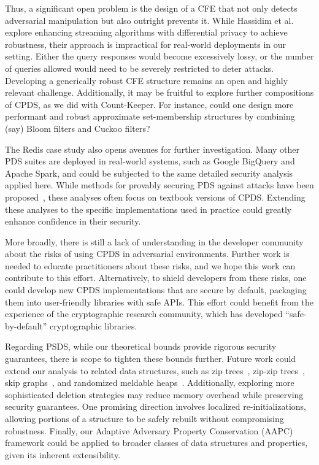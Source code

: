 Thus, a significant open problem is the design of a CFE that not only detects adversarial manipulation but also outright prevents it. While Hassidim et al.~\cite{HassidimKMMS20} explore enhancing streaming algorithms with differential privacy to achieve robustness, their approach is impractical for real-world deployments in our setting. Either the query responses would become excessively lossy, or the number of queries allowed would need to be severely restricted to deter attacks. Developing a generically robust CFE structure remains an open and highly relevant challenge. Additionally, it may be fruitful to explore further compositions of CPDS, as we did with Count-Keeper. For instance, could one design more performant and robust approximate set-membership structures by combining (say) Bloom filters and Cuckoo filters?

The Redis case study also opens avenues for further investigation. Many other PDS suites are deployed in real-world systems, such as Google BigQuery and Apache Spark, and could be subjected to the same detailed security analysis applied here. While methods for provably securing PDS against attacks have been proposed~\cite{NaorY15,clayton2019,FPUV22,PatersonR22,markelon23,filic2025deletions}, these analyses often focus on textbook versions of CPDS. Extending these analyses to the specific implementations used in practice could greatly enhance confidence in their security.

More broadly, there is still a lack of understanding in the developer community about the risks of using CPDS in adversarial environments. Further work is needed to educate practitioners about these risks, and we hope this work can contribute to this effort. Alternatively, to shield developers from these risks, one could develop new CPDS implementations that are secure by default, packaging them into user-friendly libraries with safe APIs. This effort could benefit from the experience of the cryptographic research community, which has developed “safe-by-default” cryptographic libraries.

Regarding PSDS, while our theoretical bounds provide rigorous security guarantees, there is scope to tighten these bounds further. Future work could extend our analysis to related data structures, such as zip trees~\cite{tarjan2021zip}, zip-zip trees~\cite{gila2023zip}, skip graphs~\cite{aspnes2007skip}, and randomized meldable heaps~\cite{gambin1998randomized}. Additionally, exploring more sophisticated deletion strategies may reduce memory overhead while preserving security guarantees. One promising direction involves localized re-initializations, allowing portions of a structure to be safely rebuilt without compromising robustness. Finally, our Adaptive Adversary Property Conservation (AAPC) framework could be applied to broader classes of data structures and properties, given its inherent extensibility.